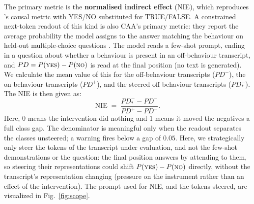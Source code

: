 \documentclass[conference]{IEEEtran}
\begin{document}
The primary metric is the \textbf{normalised indirect effect} (NIE), which reproduces
\citeauthor{marks2024}'s causal metric with YES/NO substituted for TRUE/FALSE.
A constrained next-token readout of this kind is also CAA's primary metric:
they report the average probability the model assigns to the answer matching
the behaviour on held-out multiple-choice questions \citep{rimsky2024}.
The model reads a few-shot prompt, ending in a question about whether a
behaviour is present in an off-behaviour transcript, and
$PD = P(\textsc{yes}) - P(\textsc{no})$ is read at the final position (no text
is generated). We calculate the mean value of this for the off-behaviour
transcripts ($PD^{-}$), the on-behaviour transcripts ($PD^{+}$), and the
steered off-behaviour transcripts ($PD^{-}_{*}$). The NIE is then given as:
\begin{equation}
\mathrm{NIE} \;=\; \frac{PD^{-}_{*} - PD^{-}}{PD^{+} - PD^{-}} .
\label{eq:nie}
\end{equation}
Here, $0$ means the intervention did nothing and $1$ means it moved the
negatives a full class gap. The denominator is meaningful only when the readout
separates the classes unsteered; a warning fires below a gap of $0.05$. Here,
we strategically only steer the tokens of the transcript under evaluation, and
not the few-shot demonstrations or the question: the final position answers by
attending to them, so steering their representations could shift
$P(\textsc{yes}) - P(\textsc{no})$ directly, without the transcript's
representation changing (pressure on the instrument rather than an effect of
the intervention). The prompt used for NIE, and the tokens steered, are
visualized in Fig.~\ref{fig:scope}.
\end{document}
